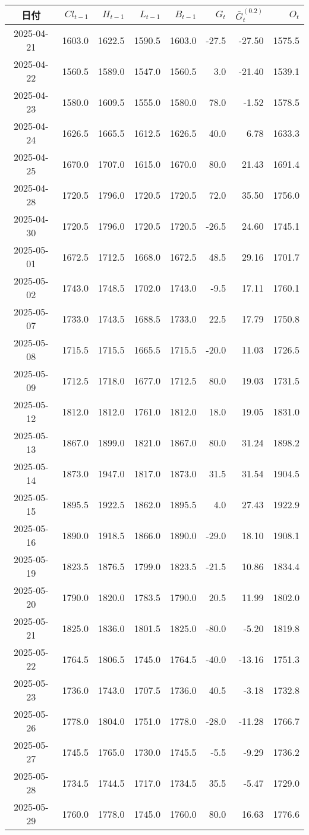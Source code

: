 \begin{tabularx}{\textwidth}{@{}c r r r r r r r@{}}
\toprule
日付 & $Cl_{t-1}$ & $H_{t-1}$ & $L_{t-1}$ & $B_{t-1}$ & $G_t$ & $\bar G_t^{(0.2)}$ & $O_t$\\
\midrule
2025-04-21 & 1603.0 & 1622.5 & 1590.5 & 1603.0 & -27.5 & -27.50 & 1575.5\\
2025-04-22 & 1560.5 & 1589.0 & 1547.0 & 1560.5 &   3.0 & -21.40 & 1539.1\\
2025-04-23 & 1580.0 & 1609.5 & 1555.0 & 1580.0 &  78.0 &  -1.52 & 1578.5\\
2025-04-24 & 1626.5 & 1665.5 & 1612.5 & 1626.5 &  40.0 &   6.78 & 1633.3\\
2025-04-25 & 1670.0 & 1707.0 & 1615.0 & 1670.0 &  80.0 &  21.43 & 1691.4\\
2025-04-28 & 1720.5 & 1796.0 & 1720.5 & 1720.5 &  72.0 &  35.50 & 1756.0\\
2025-04-30 & 1720.5 & 1796.0 & 1720.5 & 1720.5 & -26.5 &  24.60 & 1745.1\\
2025-05-01 & 1672.5 & 1712.5 & 1668.0 & 1672.5 &  48.5 &  29.16 & 1701.7\\
2025-05-02 & 1743.0 & 1748.5 & 1702.0 & 1743.0 &  -9.5 &  17.11 & 1760.1\\
2025-05-07 & 1733.0 & 1743.5 & 1688.5 & 1733.0 &  22.5 &  17.79 & 1750.8\\
2025-05-08 & 1715.5 & 1715.5 & 1665.5 & 1715.5 & -20.0 &  11.03 & 1726.5\\
2025-05-09 & 1712.5 & 1718.0 & 1677.0 & 1712.5 &  80.0 &  19.03 & 1731.5\\
2025-05-12 & 1812.0 & 1812.0 & 1761.0 & 1812.0 &  18.0 &  19.05 & 1831.0\\
2025-05-13 & 1867.0 & 1899.0 & 1821.0 & 1867.0 &  80.0 &  31.24 & 1898.2\\
2025-05-14 & 1873.0 & 1947.0 & 1817.0 & 1873.0 &  31.5 &  31.54 & 1904.5\\
2025-05-15 & 1895.5 & 1922.5 & 1862.0 & 1895.5 &   4.0 &  27.43 & 1922.9\\
2025-05-16 & 1890.0 & 1918.5 & 1866.0 & 1890.0 & -29.0 &  18.10 & 1908.1\\
2025-05-19 & 1823.5 & 1876.5 & 1799.0 & 1823.5 & -21.5 &  10.86 & 1834.4\\
2025-05-20 & 1790.0 & 1820.0 & 1783.5 & 1790.0 &  20.5 &  11.99 & 1802.0\\
2025-05-21 & 1825.0 & 1836.0 & 1801.5 & 1825.0 & -80.0 &  -5.20 & 1819.8\\
2025-05-22 & 1764.5 & 1806.5 & 1745.0 & 1764.5 & -40.0 & -13.16 & 1751.3\\
2025-05-23 & 1736.0 & 1743.0 & 1707.5 & 1736.0 &  40.5 &  -3.18 & 1732.8\\
2025-05-26 & 1778.0 & 1804.0 & 1751.0 & 1778.0 & -28.0 & -11.28 & 1766.7\\
2025-05-27 & 1745.5 & 1765.0 & 1730.0 & 1745.5 & -5.5 &  -9.29 & 1736.2\\
2025-05-28 & 1734.5 & 1744.5 & 1717.0 & 1734.5 &  35.5 &  -5.47 & 1729.0\\
2025-05-29 & 1760.0 & 1778.0 & 1745.0 & 1760.0 &  80.0 &  16.63 & 1776.6\\
\bottomrule
\end{tabularx}


